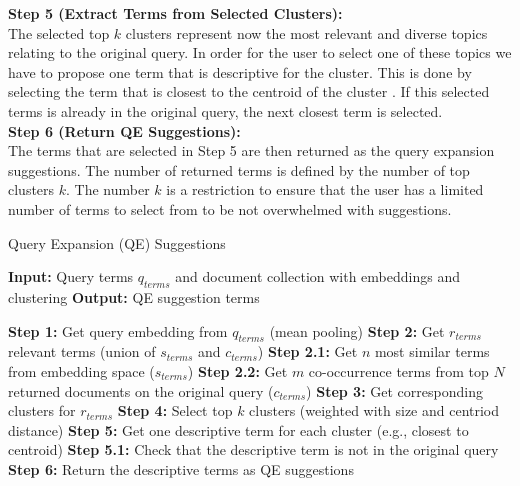\textbf{Step 5 (Extract Terms from Selected Clusters):}\\
The selected top $k$ clusters represent now the most relevant and diverse topics relating to the original query. In order for the user to select one of these topics we have to propose one term that is descriptive for the cluster. 
This is done by selecting the term that is closest to the centroid of the cluster \cite{rossiello2017centroid, khennak2019clustering}.
If this selected terms is already in the original query, the next closest term is selected.\\

\textbf{Step 6 (Return QE Suggestions):}\\
The terms that are selected in Step 5 are then returned as the query expansion suggestions. The number of returned terms is defined by the number of top clusters $k$. The number $k$ is a restriction to ensure that the user has a limited number of terms to select from to be not overwhelmed with suggestions.
\begin{algorithm}
    \caption{Query Expansion (QE) Suggestions}
    \label{alg:qe}
    \begin{algorithmic}[1]
        \State \textbf{Input:} Query terms $q_{terms}$ and document collection with embeddings and clustering
        \State \textbf{Output:} QE suggestion terms
        \State
        
        \State \textbf{Step 1:} Get query embedding from $q_{terms}$ (mean pooling)
        \State \textbf{Step 2:} Get $r_{terms}$ relevant terms (union of $s_{terms}$ and $c_{terms}$)
        \State \quad \textbf{Step 2.1:} Get $n$ most similar terms from embedding space ($s_{terms}$)
        \State \quad \textbf{Step 2.2:} Get $m$ co-occurrence terms from top $N$ returned documents on the original query  ($c_{terms}$)
        \State \textbf{Step 3:} Get corresponding clusters for $r_{terms}$
        \State \textbf{Step 4:} Select top $k$ clusters (weighted with size and centriod distance)
        \State \textbf{Step 5:} Get one descriptive term for each cluster (e.g., closest to centroid)
        \State \quad \textbf{Step 5.1:} Check that the descriptive term is not in the original query
        \State \textbf{Step 6:} Return the descriptive terms as QE suggestions
    \end{algorithmic}
\end{algorithm}


